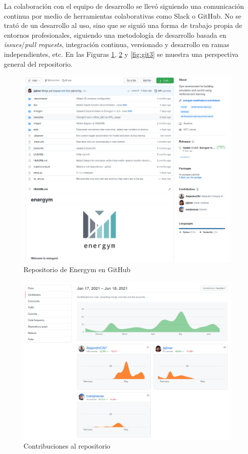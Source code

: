 La colaboración con el equipo de desarrollo se llevó siguiendo una comunicación continua por medio de herramientas colaborativas como Slack o GitHub. No se trató de un desarrollo al uso, sino que se siguió una forma de trabajo propia de entornos profesionales, siguiendo una metodología de desarrollo basada en \textit{issues}/\textit{pull requests}, integración continua, versionado y desarrollo en ramas independientes, etc. En las Figuras \ref{fig:git1}, \ref{fig:git2} y  \ref{fig:git3} se muestra una perspectiva general del repositorio.

\begin{figure}
    \centering
    \includegraphics[width=\textwidth]{imagenes/git.png}
    \caption{Repositorio de Energym en GitHub}
    \label{fig:git1}
\end{figure}

\begin{figure}
    \centering
    \includegraphics[width=\textwidth]{imagenes/git-contributions.png}
    \caption{Contribuciones al repositorio}
    \label{fig:git2}
\end{figure}

